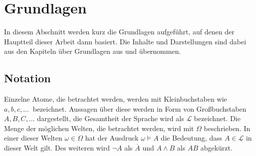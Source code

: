 \documentclass[12pt,a4paper]{article}
\newcommand{\lag}{\mathcal{L}}
\begin{document}
\section{Grundlagen}
In diesem Abschnitt werden kurz die Grundlagen aufgeführt, auf denen der Hauptteil dieser Arbeit dann basiert. Die Inhalte und Darstellungen sind dabei aus den Kapiteln über Grundlagen aus \cite{beierle19} und \cite{beierle17} übernommen.
\subsection{Notation}
Einzelne Atome, die betrachtet werden, werden mit Kleinbuchstaben wie $a, b, c,...\ $ bezeichnet. Aussagen über diese werden in Form von Großbuchstaben $A, B, C,...$ dargestellt, die Gesamtheit der Sprache wird als $\lag$ bezeichnet. Die Menge der möglichen Welten, die betrachtet werden, wird mit $\Omega$ beschrieben. In einer dieser Welten $\omega \in \Omega$  hat der Ausdruck $\omega \models A$ die Bedeutung, dass $A \in \lag$ in dieser Welt gilt. Des weiteren wird $\neg A$ als $\overline{A}$ und $A \wedge B$ als $AB$ abgekürzt.
\end{document}
